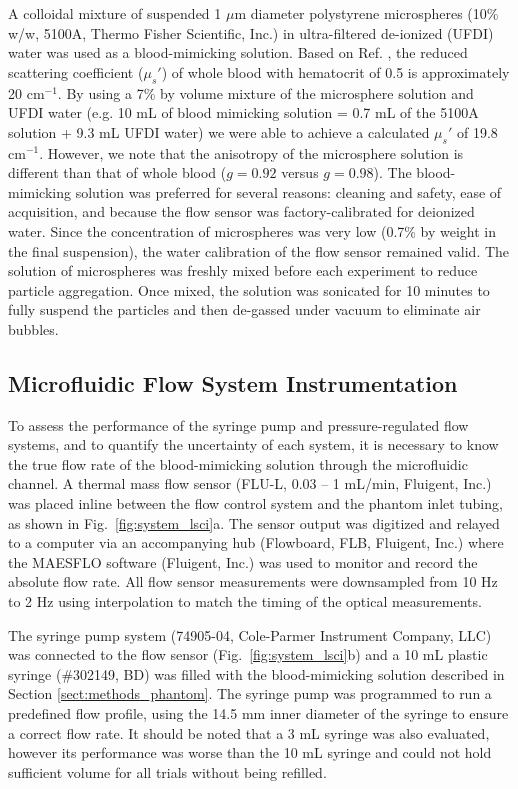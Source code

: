 \documentclass[12pt]{spieman}
\begin{document}
\begin{spacing}{2}
A colloidal mixture of suspended 1 $\mu$m diameter polystyrene microspheres (10\% w/w, 5100A, Thermo Fisher Scientific, Inc.) in ultra-filtered de-ionized (UFDI) water was used as a blood-mimicking solution. Based on Ref. , the reduced scattering coefficient ($\mu_s'$) of whole blood with hematocrit of 0.5 is approximately 20 cm$^{-1}$. By using a 7\% by volume mixture of the microsphere solution and UFDI water (e.g. 10 mL of blood mimicking solution = 0.7 mL of the 5100A solution + 9.3 mL UFDI water) we were able to achieve a calculated $\mu_s'$ of 19.8 cm$^{-1}$. However, we note that the anisotropy of the microsphere solution is different than that of whole blood ($g = 0.92$ versus $g = 0.98$). The blood-mimicking solution was preferred for several reasons: cleaning and safety, ease of acquisition, and because the flow sensor was factory-calibrated for deionized water. Since the concentration of microspheres was very low (0.7\% by weight in the final suspension), the water calibration of the flow sensor remained valid. The solution of microspheres was freshly mixed before each experiment to reduce particle aggregation. Once mixed, the solution was sonicated for 10 minutes to fully suspend the particles and then de-gassed under vacuum to eliminate air bubbles.


\subsection{Microfluidic Flow System Instrumentation}
\label{sect:methods_flow_system}

To assess the performance of the syringe pump and pressure-regulated flow systems, and to quantify the uncertainty of each system, it is necessary to know the true flow rate of the blood-mimicking solution through the microfluidic channel. A thermal mass flow sensor (FLU-L, 0.03 -- 1 mL/min, Fluigent, Inc.) was placed inline between the flow control system and the phantom inlet tubing, as shown in Fig.~\ref{fig:system_lsci}a. The sensor output was digitized and relayed to a computer via an accompanying hub (Flowboard, FLB, Fluigent, Inc.) where the MAESFLO software (Fluigent, Inc.) was used to monitor and record the absolute flow rate. All flow sensor measurements were downsampled from 10 Hz to 2 Hz using interpolation to match the timing of the optical measurements.

The syringe pump system (74905-04, Cole-Parmer Instrument Company, LLC) was connected to the flow sensor (Fig.~\ref{fig:system_lsci}b) and a 10 mL plastic syringe (\#302149, BD) was filled with the blood-mimicking solution described in Section \ref{sect:methods_phantom}. The syringe pump was programmed to run a predefined flow profile, using the 14.5 mm inner diameter of the syringe to ensure a correct flow rate. It should be noted that a 3 mL syringe was also evaluated, however its performance was worse than the 10 mL syringe and could not hold sufficient volume for all trials without being refilled.


\end{spacing}
\end{document}
